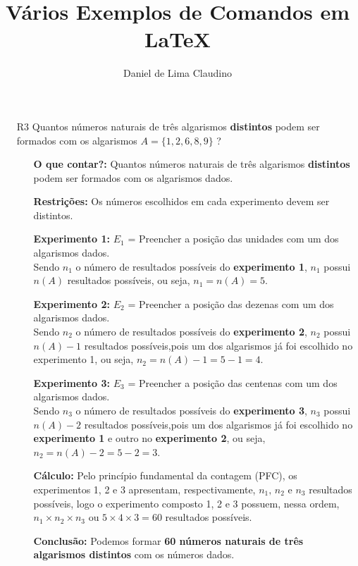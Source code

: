 \documentclass[a4paper,12pt]{article}
\begin{document}
\title{Vários Exemplos de Comandos em \LaTeX}
\author{Daniel de Lima Claudino}
\maketitle 

\begin{itemize}
  \item[R3] Quantos números naturais de três algarismos \textbf{distintos} podem ser formados com os algarismos $A = \{1, 2, 6, 8, 9\}$ ?
   \begin{itemize}
    \item[\ding{172}] \textbf{O que contar?:} Quantos números naturais de três algarismos \textbf{distintos} podem ser formados com os algarismos dados.
    \item[\ding{173}] \textbf{Restrições:} Os números escolhidos em cada experimento devem ser distintos.
    \item[\ding{174}] \textbf{Experimento 1:} $E_1$ = Preencher a posição das unidades com um dos algarismos dados.\\ Sendo $n_{1}$ o número de resultados possíveis do \textbf{experimento 1}, $n_{1}$ possui $n(A)$ resultados possíveis, ou seja, $n_{1} = n(A) = 5$.
    \item[\ding{175}] \textbf{Experimento 2:} $E_2$ = Preencher a posição das dezenas com um dos algarismos dados.\\ Sendo $n_{2}$ o número de resultados possíveis do \textbf{experimento 2}, $n_{2}$ possui $n(A)-1$ resultados possíveis,pois um dos algarismos já foi escolhido no experimento 1, ou seja, $n_{2} = n(A)-1 = 5 - 1 = 4$.
    \item[\ding{176}] \textbf{Experimento 3:} $E_3$ = Preencher a posição das centenas com um dos algarismos dados.\\ Sendo $n_{3}$ o número de resultados possíveis do \textbf{experimento 3}, $n_{3}$ possui $n(A)-2$ resultados possíveis,pois um dos algarismos já foi escolhido no \textbf{experimento 1} e outro no \textbf{experimento 2}, ou seja, $n_{2} = n(A) - 2 = 5 - 2 = 3$.   
    \item[\ding{177}] \textbf{Cálculo:} Pelo princípio fundamental da contagem (PFC), os experimentos 1, 2 e 3 apresentam, respectivamente, $n_{1},\, n_{2} \textrm{ e } n_{3}$ resultados possíveis, logo o experimento composto 1, 2 e 3 possuem, nessa ordem, $n_{1} \times n_{2} \times n_{3}$ ou $5 \times 4 \times 3 = 60$ resultados possíveis.
    \item[\ding{178}] \textbf{Conclusão:} Podemos formar \textbf{60 números naturais de três algarismos distintos} com os números dados.
  \end{itemize}
\end{itemize}
\end{document}
